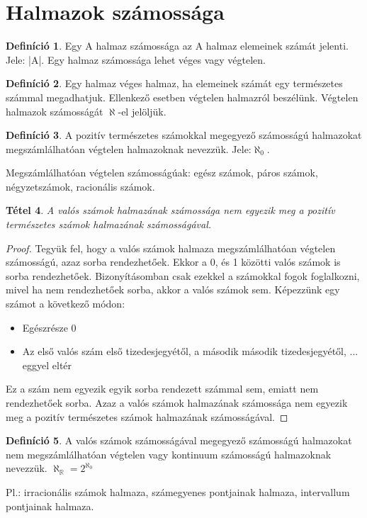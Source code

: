 \documentclass[twoside,12pt]{report}
\newtheorem{theorem}{Tétel}[section]
\theoremstyle{definition}
\newtheorem{definition}[theorem]{Definíció}
\begin{document}
\section{Halmazok számossága}
	\begin{definition}
		Egy A halmaz számossága az A halmaz elemeinek számát jelenti. Jele: |A|. Egy
		halmaz számossága lehet véges vagy végtelen.
	\end{definition}
	\begin{definition}
		Egy halmaz véges halmaz, ha elemeinek számát egy természetes számmal megadhatjuk. Ellenkező esetben végtelen halmazról beszélünk. Végtelen halmazok számosságát $\aleph$-el jelöljük.
	\end{definition}
	\begin{definition}
		A pozitív természetes számokkal megegyező számosságú halmazokat megszámlálhatóan végtelen halmazoknak nevezzük. Jele:$\aleph_0$.
		
		Megszámlálhatóan végtelen számosságúak: egész számok, páros számok, négyzetszámok, racionális számok.
	\end{definition}
	\begin{theorem}
		A valós számok halmazának számossága nem egyezik meg a pozitív természetes számok halmazának számosságával.
	\end{theorem}
	\begin{proof}
		Tegyük fel, hogy a valós számok halmaza megszámlálhatóan végtelen számosságú, azaz sorba rendezhetőek. Ekkor a 0, és 1 közötti valós számok is sorba rendezhetőek. Bizonyításomban csak ezekkel a számokkal fogok foglalkozni, mivel ha nem rendezhetőek sorba, akkor a valós számok sem. Képezzünk egy számot a következő módon:
		\begin{itemize}
			\item Egészrésze 0
			\item Az első valós szám első tizedesjegyétől, a második második tizedesjegyétől, ... eggyel eltér
		\end{itemize}
		Ez a szám nem egyezik egyik sorba rendezett számmal sem, emiatt nem rendezhetőek sorba. Azaz a valós számok halmazának számossága nem egyezik meg a pozitív természetes számok halmazának számosságával.
	\end{proof}
	\begin{definition}
		A valós számok számosságával megegyező számosságú halmazokat nem megszámlálhatóan
		végtelen vagy kontinuum számosságú halmazoknak nevezzük. $\aleph_\mathbb{R}=2^{\aleph_0}$
		
		Pl.: irracionális számok halmaza, számegyenes pontjainak halmaza, intervallum pontjainak halmaza.
	\end{definition}
\end{document}
